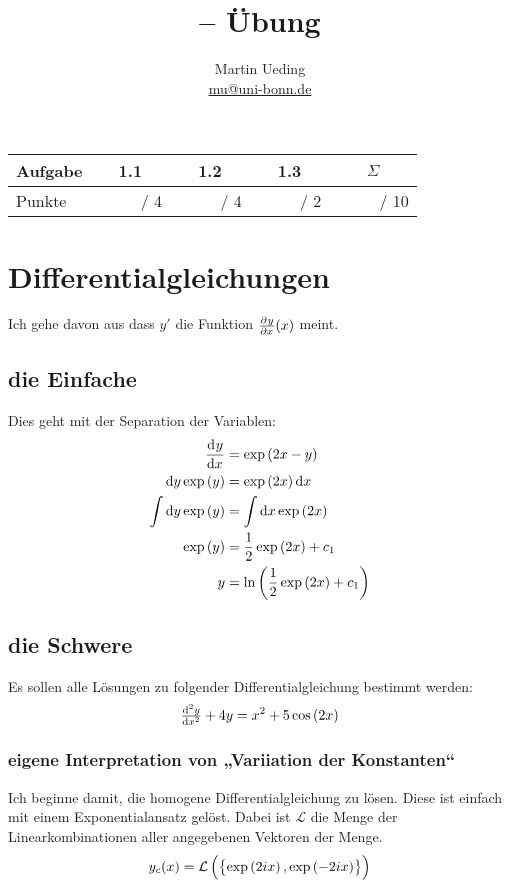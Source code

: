 \documentclass[11pt, ngerman]{article}
\title{\themodul{} -- Übung \theuebung \\ \vspace{0.5cm} \large{\thegruppe}}
\author{Martin Ueding \\ \small{\href{mailto:mu@uni-bonn.de}{mu@uni-bonn.de}}}
\newcommand{\punkte}{\textcolor{white}{xxxxx}}
\begin{document}
\maketitle

\begin{table}[h]
	\centering
	\begin{tabular}{l|c|c|c|c}
		Aufgabe & 1.1 & 1.2 & 1.3 & $\Sigma$   \\
		\hline
		Punkte & \punkte / 4 & \punkte / 4 & \punkte / 2 & \punkte / 10
	\end{tabular}
\end{table}

\section{Differentialgleichungen}

Ich gehe davon aus dass $y'$ die Funktion $\pd yx(x)$ meint.

\subsection{die Einfache}

Dies geht mit der Separation der Variablen:
%
\begin{align*}
	\dod yx &= \exp\del{2x-y} \\
	\dif y \exp\del y &= \exp\del{2x} \dif x \\
	\int \dif y \exp \del y &= \int \dif x \exp\del{2x} \\
	\exp\del y &= \frac 12 \exp\del{2x} + c_1 \\
			 y &= \ln\del{\frac 12 \exp\del{2x} + c_1}
\end{align*}


\subsection{die Schwere}

Es sollen alle Lösungen zu folgender Differentialgleichung bestimmt werden:
\[
	\od[2] yx + 4y = x^2 + 5 \cos\del{2x}
\]

\subsubsection{eigene Interpretation von „Variiation der Konstanten“}

\newcommand\ex{\exp\del{2ix}}

Ich beginne damit, die homogene Differentialgleichung zu lösen. Diese ist
einfach mit einem Exponentialansatz gelöst. Dabei ist $\mathcal L$ die Menge
der Linearkombinationen aller angegebenen Vektoren der Menge.
\[
	y_c(x) = \mathcal L \del{\set{\ex, \exp\del{-2ix}}}
\]
\end{document}
